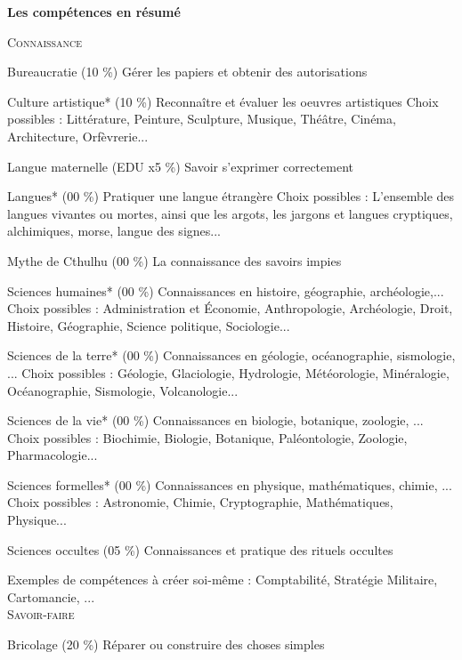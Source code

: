 \documentclass[11pt,twoside,a4paper]{article}
\begin{document}
\begin{multicols*}{2}
\dotfill


\textbf{\large Les comp{\'e}tences en r{\'e}sum{\'e}}

\textsc{Connaissance}

	Bureaucratie (10 \%)
	G{\'e}rer les papiers et obtenir des autorisations
	
	Culture artistique* (10 \%)
	Reconna{\^i}tre et {\'e}valuer les oeuvres artistiques
	Choix possibles : Litt{\'e}rature, Peinture, Sculpture, Musique, Th{\'e}{\^a}tre, Cin{\'e}ma, Architecture, Orf{\`e}vrerie...
	
	Langue maternelle (EDU x5 \%)
	Savoir s'exprimer correctement
	
	Langues* (00 \%)
	Pratiquer une langue {\'e}trang{\`e}re
	Choix possibles : L'ensemble des langues vivantes ou mortes, ainsi que les argots, les jargons et langues cryptiques, alchimiques, morse, langue des signes...
	
	Mythe de Cthulhu (00 \%)
	La connaissance des savoirs impies
	
	Sciences humaines* (00 \%)
	Connaissances en histoire, g{\'e}ographie, arch{\'e}ologie,...
	Choix possibles : Administration et {\'E}conomie, Anthropologie, Arch{\'e}ologie, Droit, Histoire, G{\'e}ographie, Science politique, Sociologie...
	
	Sciences de la terre* (00 \%)
	Connaissances en g{\'e}ologie, oc{\'e}anographie, sismologie, ...
	Choix possibles : G{\'e}ologie, Glaciologie, Hydrologie, M{\'e}t{\'e}orologie, Min{\'e}ralogie, Oc{\'e}anographie, Sismologie, Volcanologie...
	
	Sciences de la vie* (00 \%)
	Connaissances en biologie, botanique, zoologie, ...
	Choix possibles : Biochimie, Biologie, Botanique, Pal{\'e}ontologie, Zoologie, Pharmacologie...
	
	Sciences formelles* (00 \%)
	Connaissances en physique, math{\'e}matiques, chimie, ...
	Choix possibles : Astronomie, Chimie, Cryptographie, Math{\'e}matiques, Physique...
	
	Sciences occultes (05 \%)
	Connaissances et pratique des rituels occultes
	
	Exemples de comp{\'e}tences {\`a} cr{\'e}er soi-m{\^e}me : 
	Comptabilit{\'e}, Strat{\'e}gie Militaire, Cartomancie, ... ~\\

\textsc{Savoir-faire}

	Bricolage (20 \%)
	R{\'e}parer ou construire des choses simples
	

\end{multicols*}
\end{document}
